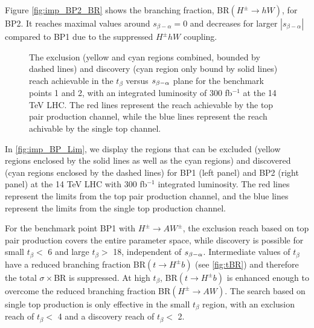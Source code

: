 Figure \ref{fig:imp_BP2_BR} shows the branching fraction, BR$(H^{\pm} \rightarrow hW)$, for BP2. It reaches maximal values around $s_{\beta-\alpha}=0$ and decreases for larger $|s_{\beta-\alpha}|$ compared to BP1 due to the suppressed $H^{\pm} hW$ coupling. 

\begin{figure}
 \centering
  \caption{The exclusion (yellow and cyan regions combined, bounded by dashed lines) and discovery (cyan region only bound by solid lines) reach achievable in the $t_{\beta}$ versus $s_{\beta-\alpha}$ plane for the benchmark points 1 and 2, with an integrated luminosity of 300 fb$^{-1}$ at the 14 TeV LHC. The red lines represent the reach achievable by the top pair production channel, while the blue lines represent the reach achivable by the single top channel.}
\label{fig:imp_BP_Lim}
\end{figure}

In \autoref{fig:imp_BP_Lim}, we display the regions that can be excluded (yellow regions enclosed by the solid lines as well as the cyan regions) and discovered (cyan regions enclosed by the dashed lines) for BP1 (left panel) and BP2 (right panel) at the 14 TeV LHC with 300 fb$^{-1}$ integrated luminosity. The red lines represent the limits from the top pair production channel, and the blue lines represent the limits from the single top production channel.

For the benchmark point BP1 with $H^{\pm} \rightarrow AW^{\pm}$, the exclusion reach based on top pair production covers the entire parameter space, while discovery is possible for small $t_{\beta}<$ 6 and large $t_{\beta}>$ 18, independent of $s_{\beta-\alpha}$. Intermediate values of $t_{\beta}$ have a reduced branching fraction BR$(t \rightarrow H^{\pm} b)$ (see \autoref{fig:tBR}) and therefore the total $\sigma\times$BR is suppressed. At high $t_{\beta}$, BR$(t \rightarrow H^{\pm}b)$ is enhanced enough to overcome the reduced branching fraction BR$(H^{\pm} \rightarrow AW)$. The search based on single top production is only effective in the small $t_{\beta}$ region, with an exclusion reach of $t_{\beta} <$ 4 and a discovery reach of $t_{\beta}<$ 2. 

